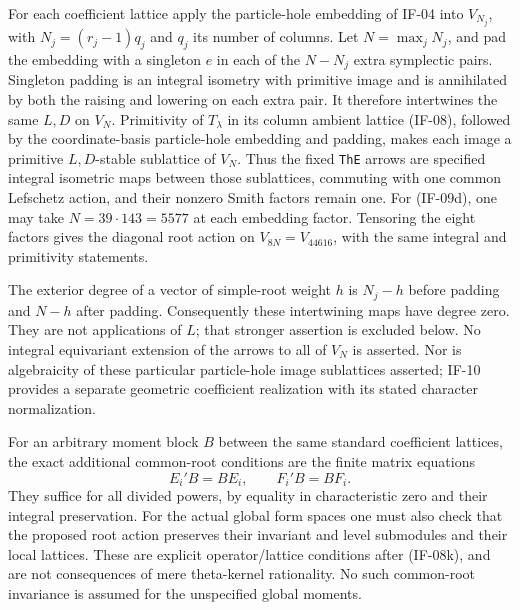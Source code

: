 For each coefficient lattice apply the particle-hole embedding of IF-04
into $V_{N_j}$, with $N_j=(r_j-1)q_j$ and $q_j$ its number of columns.
Let $N=\max_jN_j$, and pad the embedding with a singleton $e$ in each
of the $N-N_j$ extra symplectic pairs. Singleton padding is an integral
isometry with primitive image and is annihilated by both the raising
and lowering on each extra pair. It therefore intertwines the same
$L,D$ on $V_N$. Primitivity of $T_\lambda$ in its column ambient lattice
(IF-08), followed by the coordinate-basis particle-hole embedding and
padding, makes each image a primitive $L,D$-stable sublattice of $V_N$.
Thus the fixed \texttt{ThE} arrows are specified integral isometric maps
between those sublattices, commuting with one common Lefschetz action,
and their nonzero Smith factors remain one. For (IF-09d), one may take
$N=39\cdot143=5577$ at each embedding factor. Tensoring the eight
factors gives the diagonal root action on $V_{8N}=V_{44616}$, with
the same integral and primitivity statements.

The exterior degree of a vector of simple-root weight $h$ is
$N_j-h$ before padding and $N-h$ after padding. Consequently these
intertwining maps have degree zero. They are not applications of $L$;
that stronger assertion is excluded below. No integral equivariant
extension of the arrows to all of $V_N$ is asserted. Nor is algebraicity
of these particular particle-hole image sublattices asserted; IF-10
provides a separate geometric coefficient realization with its stated
character normalization.

For an arbitrary moment block $B$ between the same standard coefficient
lattices, the exact additional common-root conditions are the finite
matrix equations
\[
 E_i' B=B E_i,\qquad F_i' B=B F_i.                 \tag{IF-09f}
\]
They suffice for all divided powers, by equality in characteristic zero
and their integral preservation. For the actual global form spaces one
must also check that the proposed root action preserves their invariant
and level submodules and their local lattices. These are explicit
operator/lattice conditions after (IF-08k), and are not consequences of
mere theta-kernel rationality. No such common-root invariance is assumed
for the unspecified global moments.

